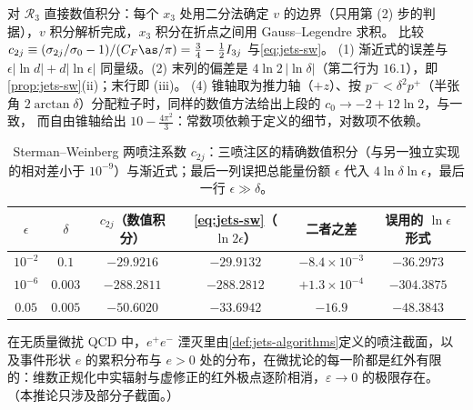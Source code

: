 \begin{example}\label{ex:jets-sw}
对 $\mathcal R_3$ 直接数值积分：每个 $x_3$ 处用二分法确定 $v$ 的边界（只用第 (2) 步的判据），$v$ 积分解析完成，$x_3$ 积分在折点之间用 Gauss--Legendre 求积。
比较 $c_{2j}\equiv(\sigma_{2j}/\sigma_0-1)/(C_F\as/\pi)=\frac34-\frac12I_{3j}$ 与\cref{eq:jets-sw}。
(1) 渐近式的误差与 $\epsilon|\ln d|+d|\ln\epsilon|$ 同量级。(2) 末列的偏差是 $4\ln2\,|\ln\delta|$（第二行为 $16.1$），即\cref{prop:jets-sw}(ii)；末行即 (iii)。
(4) 锥轴取为推力轴（$+z$）、按 $p^-<\delta^2p^+$（半张角 $2\arctan\delta$）分配粒子时，同样的数值方法给出上段的 $c_0\to-2+12\ln2$，与\cite{Becher:2015hka}一致，
而自由锥轴给出 $10-\frac{4\pi^2}{3}$：常数项依赖于定义的细节，对数项不依赖。
\end{example}

\begin{table}[htbp]
\centering
\small
\renewcommand{\arraystretch}{1.0}
\begin{tabular}{@{}cccccc@{}}
\toprule
$\epsilon$ & $\delta$ & $c_{2j}$（数值积分） & \cref{eq:jets-sw}（$\ln2\epsilon$） & 二者之差 & 误用的 $\ln\epsilon$ 形式 \\
\midrule
$10^{-2}$ & $0.1$   & $-29.9216$  & $-29.9132$  & $-8.4\times10^{-3}$ & $-36.2973$ \\
$10^{-6}$ & $0.003$ & $-288.2811$ & $-288.2812$ & $+1.3\times10^{-4}$ & $-304.3875$ \\
\midrule
$0.05$    & $0.005$ & $-50.6020$  & $-33.6942$  & $-16.9$             & $-48.3843$ \\
\bottomrule
\end{tabular}
\caption{Sterman--Weinberg 两喷注系数 $c_{2j}$：三喷注区的精确数值积分（与另一独立实现的相对差小于 $10^{-9}$）与渐近式；最后一列误把总能量份额 $\epsilon$ 代入 $4\ln\delta\ln\epsilon$，最后一行 $\epsilon\gg\delta$。}
\label{tab:jets-sw-numerics}
\end{table}

\begin{corollary}\label{cor:jets-ir-finite}
在无质量微扰 QCD 中，$e^+e^-$ 湮灭里由\cref{def:jets-algorithms}定义的喷注截面，以及事件形状 $e$ 的累积分布与 $e>0$ 处的分布，在微扰论的每一阶都是红外有限的：维数正规化中实辐射与虚修正的红外极点逐阶相消，$\varepsilon\to0$ 的极限存在。
（本推论只涉及部分子截面。）
\end{corollary}

